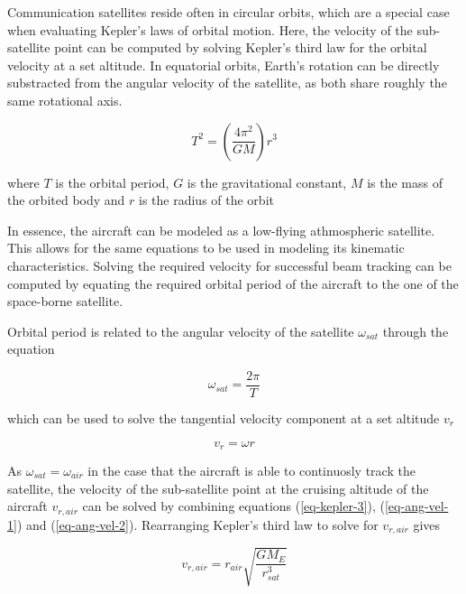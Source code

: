\documentclass[english, 12pt, a4paper, elec, utf8, a-1b, online]{aaltothesis}
\begin{document}
Communication satellites reside often in circular orbits, which are a special case when evaluating Kepler's laws of orbital motion.
Here, the velocity of the sub-satellite point can be computed by solving Kepler's third law for the orbital velocity at a set altitude.
In equatorial orbits, Earth's rotation can be directly substracted from the angular velocity of the satellite, as both share roughly the same rotational axis.

\begin{equation} \label{eq-kepler-3}
  T^2 = (\frac{4\pi^2}{GM})r^3
\end{equation}

where $T$ is the orbital period, $G$ is the gravitational constant, $M$ is the mass of the orbited body and $r$ is the radius of the orbit %

In essence, the aircraft can be modeled as a low-flying athmospheric satellite.
This allows for the same equations to be used in modeling its kinematic characteristics.
Solving the required velocity for successful beam tracking can be computed by equating the required orbital period of the aircraft to the one of the space-borne satellite.

Orbital period is related to the angular velocity of the satellite $\omega_{sat}$ through the equation

\begin{equation} \label{eq-ang-vel-1}
  \omega_{sat} = \frac{2\pi}{T}
\end{equation}

\noindent
which can be used to solve the tangential velocity component at a set altitude $v_r$

\begin{equation} \label{eq-ang-vel-2}
  v_r = \omega r
\end{equation}

\noindent
As $\omega_{sat} = \omega_{air}$ in the case that the aircraft is able to continuosly track the satellite, the velocity of the sub-satellite point at the cruising altitude of the aircraft $v_{r, air}$ can be solved by combining equations (\ref{eq-kepler-3}), (\ref{eq-ang-vel-1}) and (\ref{eq-ang-vel-2}).
Rearranging Kepler's third law to solve for $v_{r, air}$ gives

\begin{equation} \label{eq-v-air-equatorial}
  v_{r, air} = r_{air} \sqrt{\frac{G M_E}{r_{sat}^3}}
\end{equation}
\end{document}
